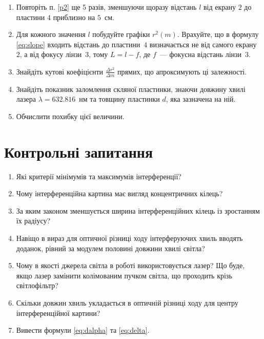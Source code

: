 \begin{enumerate}[label*=\arabic*.]
	\item Повторіть п. \ref{p2} ще 5 разів, зменшуючи щоразу відстань $l$ від екрану  \hyperref[fig:scheme]{$2$} до пластини \hyperref[fig:scheme]{$4$} приблизно на $5$~см.
	\item Для кожного значення $l$ побудуйте графіки $r^2(m)$. Врахуйте, що в формулу \eqref{eq:slope} входить відстань до  пластини~\hyperref[fig:device]{$4$} визначається не від самого екрану~\hyperref[fig:device]{$2$}, а від фокусу лінзи~\hyperref[fig:device]{$3$}, тому $L = l - f$, де $f$~--- фокусна відстань лінзи~\hyperref[fig:device]{$3$}. 
	\item Знайдіть кутові коефіцієнти \hyperref[eq:slope]{$\frac{\Delta r^2}{\Delta m}$} прямих, що апроксимують ці залежності.
	\item Знайдіть показник заломлення скляної пластинки, знаючи довжину хвилі лазера $\lambda = 632.816$~нм та товщину пластинки $d$, яка зазначена на ній.
	\item Обчислити похибку цієї величини.
\end{enumerate}

\section*{Контрольні запитання}
\begin{enumerate}[label*=\arabic*.]
	\item Які критерії мінімумів та максимумів інтерференції?
	\item Чому інтерференційна картина має вигляд концентричних кілець?
	\item За яким законом зменшується ширина інтерференційних кілець із зростанням їх радіусу?
	\item Навіщо в вираз для оптичної різниці ходу інтерферуючих хвиль вводять доданок, рівний за модулем половині довжини хвилі світла?
	\item Чому в якості джерела світла в роботі використовується лазер? Що буде, якщо лазер замінити колімованим пучком світла, що проходить крізь світлофільтр?
	\item Скільки довжин хвиль укладається в оптичній різниці ходу для центру інтерференційної картини?
	\item Вивести формули \eqref{eq:dalpha} та \eqref{eq:delta}.
\end{enumerate}